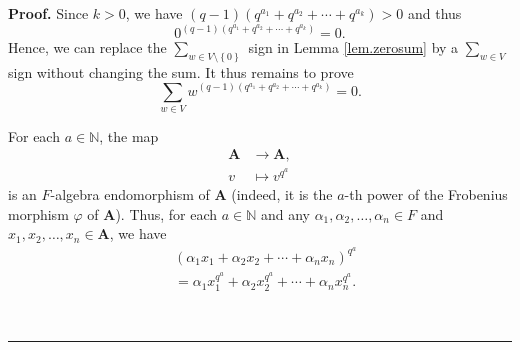 \documentclass[numbers=enddot,12pt,final,onecolumn,notitlepage]{scrartcl}%
\numberwithin{exer}{section}
\theoremstyle{definition}
\newenvironment{proof}[1][Proof]{\noindent\textbf{#1.} }{\ \rule{0.5em}{0.5em}}
\let\sumnonlimits\sum
\renewcommand{\sum}{\sumnonlimits\limits}
\theoremstyle{plainsl}
\begin{document}
\begin{proof}
Since $k>0$, we have $\left(  q-1\right)  \left(  q^{a_{1}}+q^{a_{2}}%
+\cdots+q^{a_{k}}\right)  >0$ and thus%
\[
0^{\left(  q-1\right)  \left(  q^{a_{1}}+q^{a_{2}}+\cdots+q^{a_{k}}\right)
}=0.
\]
Hence, we can replace the $\sum_{w\in V\setminus\left\{  0\right\}  }$ sign in
Lemma \ref{lem.zerosum} by a $\sum_{w\in V}$ sign without changing the sum. It
thus remains to prove
\begin{equation}
\sum_{w\in V}w^{\left(  q-1\right)  \left(  q^{a_{1}}+q^{a_{2}}+\cdots
+q^{a_{k}}\right)  }=0. \label{pf.lem.zerosum.1}%
\end{equation}


For each $a\in\mathbb{N}$, the map
\begin{align*}
\mathbf{A}  &  \rightarrow\mathbf{A},\\
v  &  \mapsto v^{q^{a}}%
\end{align*}
is an $F$-algebra endomorphism of $\mathbf{A}$ (indeed, it is the $a$-th power
of the Frobenius morphism $\varphi$ of $\mathbf{A}$). Thus, for each
$a\in\mathbb{N}$ and any $\alpha_{1},\alpha_{2},\ldots,\alpha_{n}\in F$ and
$x_{1},x_{2},\ldots,x_{n}\in\mathbf{A}$, we have%
\begin{align}
&  \left(  \alpha_{1}x_{1}+\alpha_{2}x_{2}+\cdots+\alpha_{n}x_{n}\right)
^{q^{a}}\nonumber\\
&  =\alpha_{1}x_{1}^{q^{a}}+\alpha_{2}x_{2}^{q^{a}}+\cdots+\alpha_{n}%
x_{n}^{q^{a}}. \label{pf.lem.zerosum.frobeq}%
\end{align}



\end{proof}
\end{document}
